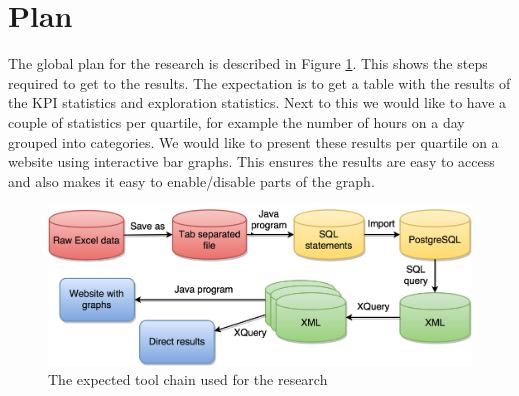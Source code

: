\section{Plan}
The global plan for the research is described in Figure \ref{fig:toolchain}. This shows the steps required to get to the results. The expectation is to get a table with the results of the KPI statistics and exploration statistics. Next to this we would like to have a couple of statistics per quartile, for example the number of hours on a day grouped into categories. We would like to present these results per quartile on a website using interactive bar graphs. This ensures the results are easy to access and also makes it easy to enable/disable parts of the graph.

\begin{figure}[!h]
	\centering
	\includegraphics[width=170mm]{ToolChain.png}
	\caption{The expected tool chain used for the research}
	\label{fig:toolchain}
\end{figure}